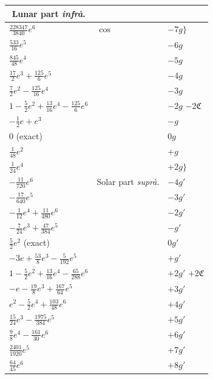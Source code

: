\documentclass[11pt]{article}
\begin{document}
\begin{center}
\begin{tabular}{|l|l|l|}
\hline
\multicolumn{1}{|c|}{Lunar part \textit{infr\`a}.} & & \\
\hline
$\tfrac{228347}{3840}e^{6}$            & $\cos$ & $-7g\bigr\}$ \\
$\tfrac{533}{16}e^{5}$                 &        & $-6g$ \\
$\tfrac{845}{48}e^{4}$                 &        & $-5g$ \\
$\tfrac{17}{2}e^{3}+\tfrac{125}{6}e^{5}$ &      & $-4g$ \\
$\tfrac{7}{2}e^{2}-\tfrac{125}{16}e^{4}$ &      & $-3g$ \\
$1-\tfrac{5}{2}e^{2}+\tfrac{13}{16}e^{4}-\tfrac{125}{6}e^{6}$ & & $-2g$ \quad $-2\mathfrak{C}$ \\
$-\tfrac{1}{2}e+e^{3}$                 &        & $-g$ \\
$0$ (exact)                            &        & $0g$ \\
$\tfrac{1}{48}e^{2}$                   &        & $+g$ \\
$\tfrac{1}{24}e^{4}$                   &        & $+2g\bigr\}$ \\
\hline
$-\tfrac{11}{720}e^{6}$                                 & Solar part \textit{supr\`a}. & $-4g'$ \\
$-\tfrac{17}{640}e^{5}$                                 &                              & $-3g'$ \\
$-\tfrac{1}{12}e^{4}+\tfrac{11}{480}e^{6}$              &                              & $-2g'$ \\
$-\tfrac{7}{24}e^{3}+\tfrac{47}{384}e^{5}$              &                              & $-g'$ \\
$\tfrac{5}{2}e^{2}$ (exact)                             &                              & $0g'$ \\
$-3e+\tfrac{53}{8}e^{3}-\tfrac{5}{192}e^{5}$            &                              & $+g'$ \\
$1-\tfrac{5}{2}e^{2}+\tfrac{13}{16}e^{4}-\tfrac{65}{288}e^{6}$ & &                       $+2g'$ \quad $+2\mathfrak{C}$ \\
$-e-\tfrac{19}{8}e^{3}+\tfrac{167}{64}e^{5}$            &                              & $+3g'$ \\
$e^{2}-\tfrac{5}{2}e^{4}+\tfrac{103}{48}e^{6}$          &                              & $+4g'$ \\
$\tfrac{15}{24}e^{3}-\tfrac{1975}{384}e^{5}$            &                              & $+5g'$ \\
$\tfrac{9}{8}e^{4}-\tfrac{161}{30}e^{6}$                &                              & $+6g'$ \\
$\tfrac{2401}{1920}e^{5}$                               &                              & $+7g'$ \\
$\tfrac{64}{45}e^{6}$                                   &                              & $+8g'$ \\
\hline
\end{tabular}
\end{center}
\end{document}
